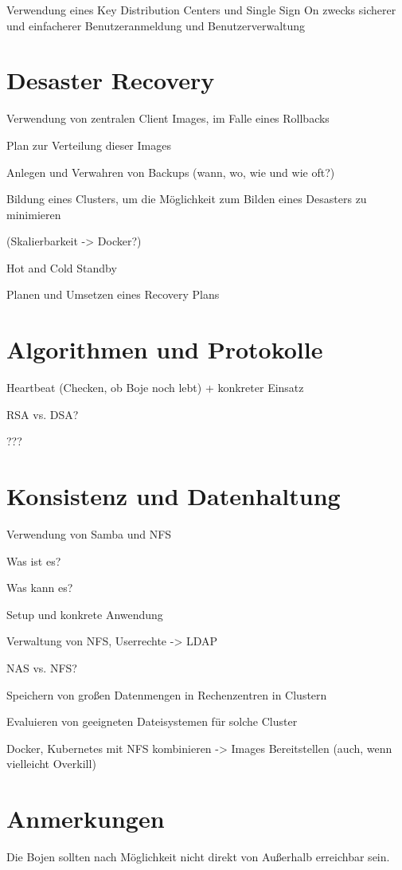 Verwendung eines Key Distribution Centers und Single Sign On zwecks sicherer und einfacherer Benutzeranmeldung und Benutzerverwaltung

\section{Desaster Recovery}
\label{sec:Desaster Recovery}
Verwendung von zentralen Client Images, im Falle eines Rollbacks

Plan zur Verteilung dieser Images

Anlegen und Verwahren von Backups (wann, wo, wie und wie oft?)

Bildung eines Clusters, um die Möglichkeit zum Bilden eines Desasters zu minimieren

(Skalierbarkeit -> Docker?)

Hot and Cold Standby

Planen und Umsetzen eines Recovery Plans


\section{Algorithmen und Protokolle}
\label{sec:Algorithmen und Protokolle}
Heartbeat (Checken, ob Boje noch lebt) +  konkreter Einsatz

RSA vs. DSA?

???



\section{Konsistenz und Datenhaltung}
\label{sec:Konsistenz und Datenhaltung}
Verwendung von Samba und NFS

Was ist es?

Was kann es?

Setup und konkrete Anwendung

Verwaltung von NFS, Userrechte -> LDAP

NAS vs. NFS?

Speichern von großen Datenmengen in Rechenzentren in Clustern

Evaluieren von geeigneten Dateisystemen für solche Cluster

Docker, Kubernetes mit NFS kombinieren -> Images Bereitstellen (auch, wenn vielleicht Overkill)


\section{Anmerkungen}
\label{sec:Anmerkungen}
Die Bojen sollten nach Möglichkeit nicht direkt von Außerhalb erreichbar sein.



%
